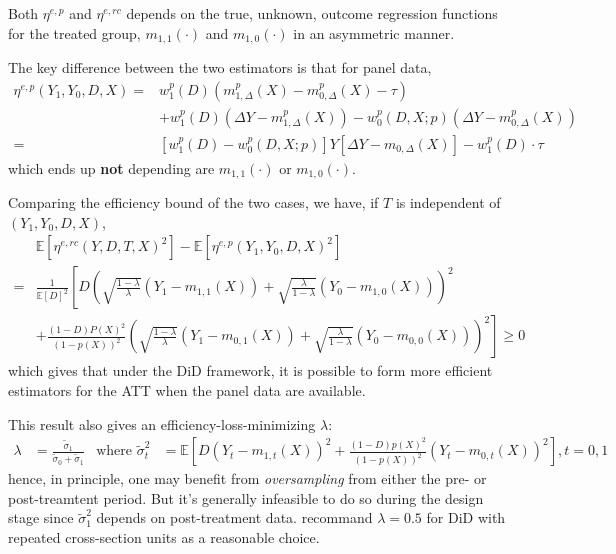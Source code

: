 \documentclass[twoside]{article}
\begin{document}
Both $\eta^{e,p}$ and $\eta^{e,rc}$ depends on the true, unknown, outcome regression functions for the treated group, $m_{1,1}(\cdot)$ and $m_{1,0}(\cdot)$ in an asymmetric manner.

The key difference between the two estimators is that for panel data, 
\begin{align*}
    \eta^{e,p}\left(Y_1,Y_0,D,X\right) =& w^p_1(D)\left(m^p_{1,\Delta}(X) - m^p_{0,\Delta}(X) -\tau \right) \\
    &+ w_1^p(D)\left(\Delta Y-m^p_{1,\Delta}(X)\right) - w^p_0(D,X;p)\left(\Delta Y-m^p_{0,\Delta}(X)\right) \\
    =& \left[w^p_1(D) - w^p_0(D,X;p)\right] Y \left[\Delta Y - m_{0,\Delta}(X)\right] - w_1^p(D)\cdot\tau 
\end{align*}
which ends up \textbf{not} depending are $m_{1,1}(\cdot)$ or $m_{1,0}(\cdot)$. 

Comparing the efficiency bound of the two cases, we have, if $T$ is independent of $\left(Y_1,Y_0,D,X\right)$,
\begin{align*}
    &\mathbb{E}\left[\eta^{e,rc}\left(Y,D,T,X\right)^2\right] - \mathbb{E}\left[\eta^{e,p}\left(Y_1,Y_0,D,X\right)^2\right]\\
    =& \frac{1}{\mathbb{E}\left[D\right]^2} \left[ D\left(\sqrt{\frac{1-\lambda}{\lambda}}\left(Y_1-m_{1,1}(X)\right) + \sqrt{\frac{\lambda}{1-\lambda}}\left(Y_0-m_{1,0}(X)\right)\right)^2 \right.\\
    & \left. + \frac{(1-D)P(X)^2}{\left(1-p(X)\right)^2} \left(\sqrt{\frac{1-\lambda}{\lambda}}\left(Y_1-m_{0,1}(X)\right)+\sqrt{\frac{\lambda}{1-\lambda}}\left(Y_0-m_{0,0}(X)\right)  \right)^2 \right] \geq 0
\end{align*}
which gives that under the DiD framework, it is possible to form more efficient estimators for the ATT when the panel data are available.

This result also gives an efficiency-loss-minimizing $\lambda$:
\begin{align*}
    \lambda &= \frac{\tilde{\sigma}_1}{\tilde{\sigma}_0+ \tilde{\sigma}_1} & \text{where }\tilde{\sigma}^2_t &=\mathbb{E}\left[D\left(Y_t-m_{1,t}(X)\right)^2 + \frac{(1-D)p(X)^2}{\left(1-p(X)\right)^2}\left(Y_t-m_{0,t}(X)\right)^2 \right], t=0,1
\end{align*}
hence, in principle, one may benefit from \textit{oversampling} from either the pre- or post-treamtent period. But it's generally infeasible to do so during the design stage since $\tilde{\sigma}_1^2$ depends on post-treatment data. \citet{sant2020doubly} recommand $\lambda=0.5$ for DiD with repeated cross-section units as a reasonable choice.
\end{document}
